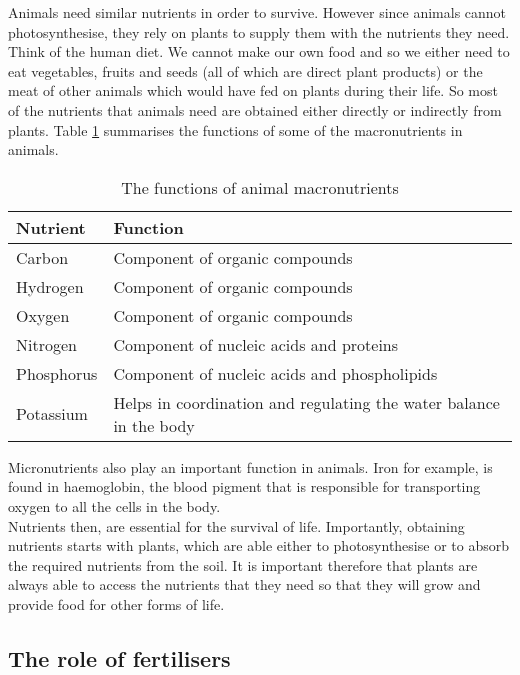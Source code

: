 Animals need similar nutrients in order to survive. However since animals cannot photosynthesise, they rely on plants to supply them with the nutrients they need. Think of the human diet. We cannot make our own food and so we either need to eat vegetables, fruits and seeds (all of which are direct plant products) or the meat of other animals which would have fed on plants during their life. So most of the nutrients that animals need are obtained either directly or indirectly from plants. Table \ref{tab:animal macronutrients} summarises the functions of some of the macronutrients in animals.

\begin{table}[h]
\begin{center}
\caption{The functions of animal macronutrients}
\label{tab:animal macronutrients}
\begin{tabular}{|p{3.5cm}|p{5cm}|}\hline
\textbf{Nutrient} & \textbf{Function}\\\hline
Carbon & Component of organic compounds \\\hline
Hydrogen & Component of organic compounds \\\hline
Oxygen & Component of organic compounds \\\hline
Nitrogen & Component of nucleic acids and proteins\\\hline
Phosphorus & Component of nucleic acids and phospholipids \\\hline
Potassium & Helps in coordination and regulating the water balance in the body \\\hline
\end{tabular}
\end{center}
\end{table}

Micronutrients also play an important function in animals. Iron for example, is found in haemoglobin, the blood pigment that is responsible for transporting oxygen to all the cells in the body.\\

Nutrients then, are essential for the survival of life. Importantly, obtaining nutrients starts with plants, which are able either to photosynthesise or to absorb the required nutrients from the soil. It is important therefore that plants are always able to access the nutrients that they need so that they will grow and provide food for other forms of life.

\clearpage

\subsection{The role of fertilisers}


